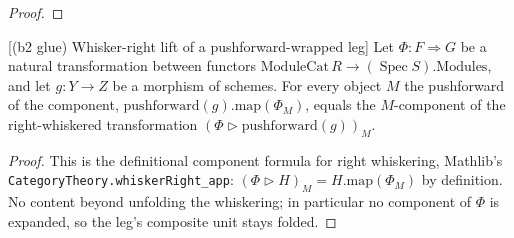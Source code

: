 \begin{lemma}
\begin{proof}
  \end{proof}
\end{lemma}


\begin{lemma}

[(b2 glue) Whisker-right lift of a pushforward-wrapped leg]
  \label{lem:ring_square_glue_whiskerRight_lift}
  Let \(\Phi : F \Rightarrow G\) be a natural transformation between functors
  \(\mathrm{ModuleCat}\,R \to (\operatorname{Spec} S).\mathrm{Modules}\), and let \(g : Y \to Z\) be a
  morphism of schemes. For every object \(M\) the pushforward of the component,
  \(\mathrm{pushforward}(g).\mathrm{map}(\Phi_M)\), equals the \(M\)-component of the right-whiskered
  transformation \((\Phi \rhd \mathrm{pushforward}(g))_M\).
  \begin{proof}
    This is the definitional component formula for right whiskering, Mathlib's
    \texttt{CategoryTheory.whiskerRight\_app}: \((\Phi \rhd H)_M = H.\mathrm{map}(\Phi_M)\) by
    definition. No content beyond unfolding the whiskering; in particular no component of \(\Phi\) is
    expanded, so the leg's composite unit stays folded.
  \end{proof}
\end{lemma}

